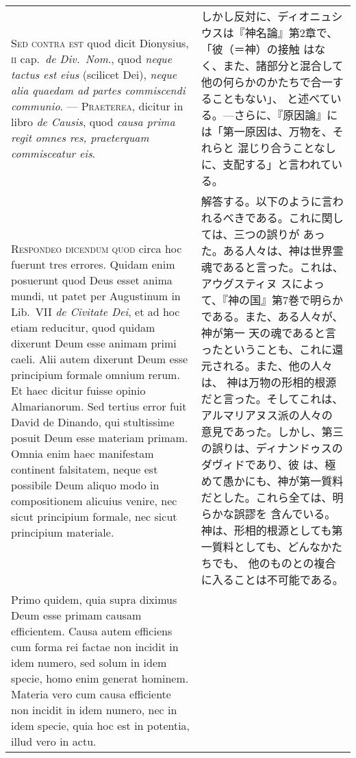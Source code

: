 \documentclass[10pt]{jsarticle}
\begin{document}
\begin{longtable}{p{21em}p{21em}}
\\

{\scshape Sed contra est} quod dicit Dionysius, {\scshape ii}
 cap.~{\itshape de Div.~Nom}., quod {\itshape neque tactus est eius}
 (scilicet Dei), {\itshape neque alia quaedam ad partes commiscendi
 communio}. --- {\scshape Praeterea}, dicitur in libro {\itshape de
 Causis}, quod {\itshape causa prima regit omnes res, praeterquam
 commisceatur eis}.

&

しかし反対に、ディオニュシウスは『神名論』第2章で、「彼（＝神）の接触
はなく、また、諸部分と混合して他の何らかのかたちで合一することもない」、
と述べている。---さらに、『原因論』には「第一原因は、万物を、それらと
混じり合うことなしに、支配する」と言われている。


\\

{\scshape Respondeo dicendum quod} circa hoc fuerunt tres
 errores. Quidam enim posuerunt quod Deus esset anima mundi, ut patet
 per Augustinum in Lib.~VII {\itshape de Civitate Dei}, et ad hoc
 etiam reducitur, quod quidam dixerunt Deum esse animam primi caeli.
 Alii autem dixerunt Deum esse principium formale omnium rerum. Et
 haec dicitur fuisse opinio Almarianorum.  Sed tertius error fuit
 David de Dinando, qui stultissime posuit Deum esse materiam primam.
 Omnia enim haec manifestam continent falsitatem, neque est possibile
 Deum aliquo modo in compositionem alicuius venire, nec sicut
 principium formale, nec sicut principium materiale.

&

解答する。以下のように言われるべきである。これに関しては、三つの誤りが
あった。ある人々は、神は世界霊魂であると言った。これは、アウグスティヌ
スによって、『神の国』第7巻で明らかである。また、ある人々が、神が第一
天の魂であると言ったということも、これに還元される。また、他の人々は、
神は万物の形相的根源だと言った。そしてこれは、アルマリアヌス派の人々の
意見であった。しかし、第三の誤りは、ディナンドゥスのダヴィドであり、彼
は、極めて愚かにも、神が第一質料だとした。これら全ては、明らかな誤謬を
含んでいる。神は、形相的根源としても第一質料としても、どんなかたちでも、
他のものとの複合に入ることは不可能である。

\\

Primo quidem, quia supra diximus Deum esse primam causam
efficientem. Causa autem efficiens cum forma rei factae non incidit in
idem numero, sed solum in idem specie, homo enim generat
hominem. Materia vero cum causa efficiente non incidit in idem numero,
nec in idem specie, quia hoc est in potentia, illud vero in actu.


\end{longtable}
\end{document}
